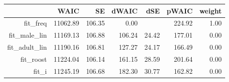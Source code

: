 \begin{table}[ht]
\centering
\begin{tabular}{rrrrrrr}
  \hline
 & WAIC & SE & dWAIC & dSE & pWAIC & weight \\ 
  \hline
fit\_freq & 11062.89 & 106.35 & 0.00 &  & 224.92 & 1.00 \\ 
  fit\_male\_lin & 11169.13 & 106.88 & 106.24 & 24.42 & 177.01 & 0.00 \\ 
  fit\_adult\_lin & 11190.16 & 106.81 & 127.27 & 24.17 & 166.49 & 0.00 \\ 
  fit\_roost & 11224.04 & 106.14 & 161.15 & 28.59 & 201.64 & 0.00 \\ 
  fit\_i & 11245.19 & 106.68 & 182.30 & 30.77 & 162.82 & 0.00 \\ 
   \hline
\end{tabular}
\end{table}
